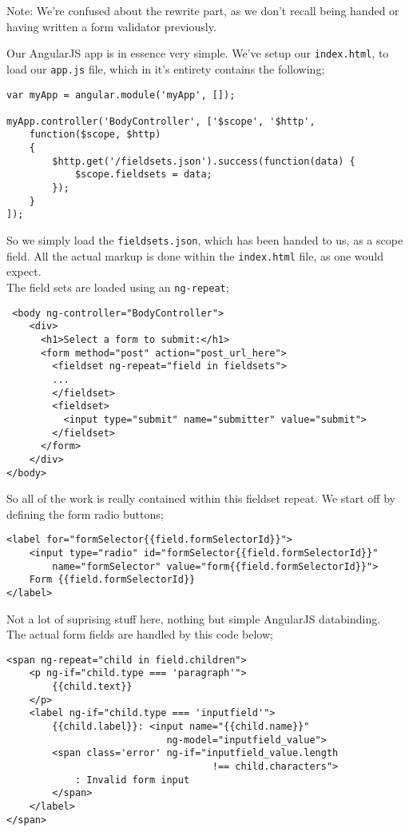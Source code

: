 Note: We're confused about the rewrite part, as we don't recall being handed or having written a form validator previously.

Our AngularJS app is in essence very simple. We've setup our \verb|index.html|,
to load our \verb|app.js| file, which in it's entirety contains the following;
\begin{verbatim}
var myApp = angular.module('myApp', []);

myApp.controller('BodyController', ['$scope', '$http',
    function($scope, $http)
    {
        $http.get('/fieldsets.json').success(function(data) {
            $scope.fieldsets = data;
        });
    }
]);
\end{verbatim}
So we simply load the \verb|fieldsets.json|, which has been handed to us, as a scope field.
All the actual markup is done within the \verb|index.html| file, as one would expect.
\\
The field sets are loaded using an \verb|ng-repeat|;
\begin{verbatim}
 <body ng-controller="BodyController">
    <div>
      <h1>Select a form to submit:</h1>
      <form method="post" action="post_url_here">
        <fieldset ng-repeat="field in fieldsets">
        ...
        </fieldset>
        <fieldset>
          <input type="submit" name="submitter" value="submit">
        </fieldset>
      </form>
    </div>
</body>
\end{verbatim}
So all of the work is really contained within this fieldset repeat.
We start off by defining the form radio buttons;
\begin{verbatim}
<label for="formSelector{{field.formSelectorId}}">
    <input type="radio" id="formSelector{{field.formSelectorId}}"
        name="formSelector" value="form{{field.formSelectorId}}">
    Form {{field.formSelectorId}}
</label>
\end{verbatim}
Not a lot of suprising stuff here, nothing but simple AngularJS databinding.
\\
The actual form fields are handled by this code below;
\begin{verbatim}
<span ng-repeat="child in field.children">
    <p ng-if="child.type === 'paragraph'">
        {{child.text}}
    </p>
    <label ng-if="child.type === 'inputfield'">
        {{child.label}}: <input name="{{child.name}}"
                            ng-model="inputfield_value">
        <span class='error' ng-if="inputfield_value.length
                                    !== child.characters">
            : Invalid form input
        </span>
    </label>
</span>
\end{verbatim}
